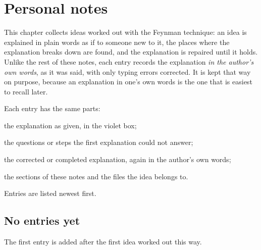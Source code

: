 \chapter{Personal notes}
\label{ch:personal}

This chapter collects ideas worked out with the Feynman technique: an idea is explained in plain
words as if to someone new to it, the places where the explanation breaks down are found, and the
explanation is repaired until it holds. Unlike the rest of these notes, each entry records the
explanation \emph{in the author's own words}, as it was said, with only typing errors corrected.
It is kept that way on purpose, because an explanation in one's own words is the one that is
easiest to recall later.

Each entry has the same parts:
\begin{description}[style=nextline]
  \item[In my own words] the explanation as given, in the violet box;
  \item[Where it broke down] the questions or steps the first explanation could not answer;
  \item[Repaired] the corrected or completed explanation, again in the author's own words;
  \item[Links] the sections of these notes and the files the idea belongs to.
\end{description}
Entries are listed newest first.

%
%
%
%
%

\section*{No entries yet}
The first entry is added after the first idea worked out this way.
